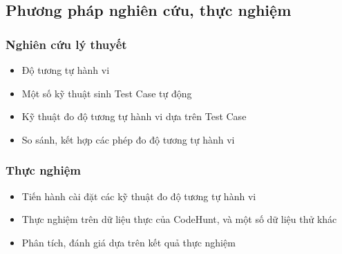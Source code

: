 \subsection*{Phương pháp nghiên cứu, thực nghiệm}
\subsubsection*{Nghiên cứu lý thuyết}
\begin{itemize}
\item Độ tương tự hành vi
\item Một số kỹ thuật sinh Test Case tự động
\item Kỹ thuật đo độ tương tự hành vi dựa trên Test Case
\item So sánh, kết hợp các phép đo độ tương tự hành vi
\end{itemize}
		
\subsubsection*{Thực nghiệm}
\begin{itemize}
\item Tiến hành cài đặt các kỹ thuật đo độ tương tự hành vi
\item Thực nghiệm trên dữ liệu thực của CodeHunt, và một số dữ liệu thử khác
\item Phân tích, đánh giá dựa trên kết quả thực nghiệm
\end{itemize}





